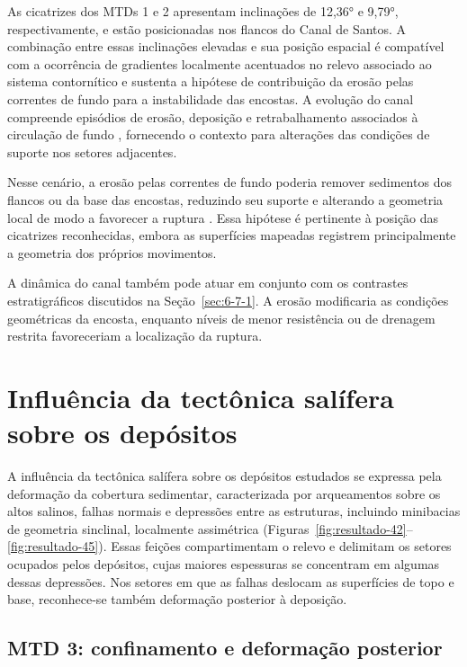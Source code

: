 As cicatrizes dos MTDs 1 e 2 apresentam inclinações de 12,36° e 9,79°, respectivamente, e estão posicionadas nos flancos do Canal de Santos. A combinação entre essas inclinações elevadas e sua posição espacial é compatível com a ocorrência de gradientes localmente acentuados no relevo associado ao sistema contornítico e sustenta a hipótese de contribuição da erosão pelas correntes de fundo para a instabilidade das encostas. A evolução do canal compreende episódios de erosão, deposição e retrabalhamento associados à circulação de fundo \cite{duarte2007,dutra2019}, fornecendo o contexto para alterações das condições de suporte nos setores adjacentes.

Nesse cenário, a erosão pelas correntes de fundo poderia remover sedimentos dos flancos ou da base das encostas, reduzindo seu suporte e alterando a geometria local de modo a favorecer a ruptura \cite{lee2007,scarselli2020}. Essa hipótese é pertinente à posição das cicatrizes reconhecidas, embora as superfícies mapeadas registrem principalmente a geometria dos próprios movimentos.

A dinâmica do canal também pode atuar em conjunto com os contrastes estratigráficos discutidos na Seção~\ref{sec:6-7-1}. A erosão modificaria as condições geométricas da encosta, enquanto níveis de menor resistência ou de drenagem restrita favoreceriam a localização da ruptura.

\section{Influência da tectônica salífera sobre os depósitos}\label{sec:6-2}

A influência da tectônica salífera sobre os depósitos estudados se expressa pela deformação da cobertura sedimentar, caracterizada por arqueamentos sobre os altos salinos, falhas normais e depressões entre as estruturas, incluindo minibacias de geometria sinclinal, localmente assimétrica (Figuras~\ref{fig:resultado-42}--\ref{fig:resultado-45}). Essas feições compartimentam o relevo e delimitam os setores ocupados pelos depósitos, cujas maiores espessuras se concentram em algumas dessas depressões. Nos setores em que as falhas deslocam as superfícies de topo e base, reconhece-se também deformação posterior à deposição.

\subsection{MTD 3: confinamento e deformação posterior}\label{sec:6-2-1}

